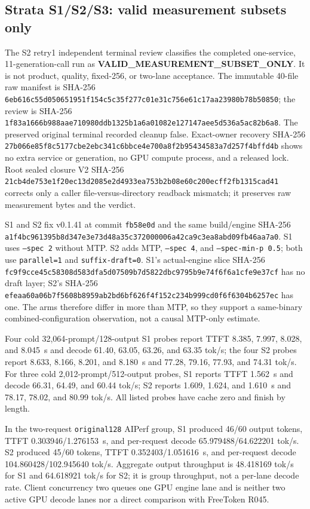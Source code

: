 \documentclass[11pt]{article}
\begin{document}
\subsection{Strata S1/S2/S3: valid measurement subsets only}
\label{sec:strata}

The S2 retry1 independent terminal review classifies the completed one-service, 11-generation-call run as \textbf{VALID\_MEASUREMENT\_SUBSET\_ONLY}. It is not product, quality, fixed-256, or two-lane acceptance. The immutable 40-file raw manifest is SHA-256 \texttt{6eb616c55d050651951f154c5c35f277c01e31c756e61c17aa23980b78b50850}; the review is SHA-256 \texttt{1f83a1666b988aae710980ddb1325b1a6a01082e127147aee5d536a5ac82b6a8}. The preserved original terminal recorded cleanup false. Exact-owner recovery SHA-256 \texttt{27b066e85f8c5177cbe2ebc341c6bbce4e700a8f2b95434583a7d257f4bffd4b} shows no extra service or generation, no GPU compute process, and a released lock. Root sealed closure V2 SHA-256 \texttt{21cb4de753e1f20ec13d2085e2d4933ea753b2b08e60c200ecff2fb1315cad41} corrects only a caller file-versus-directory readback mismatch; it preserves raw measurement bytes and the verdict.

S1 and S2 fix v0.1.41 at commit \texttt{fb58e0d} and the same build/engine SHA-256 \texttt{a1f4bc961395b8d347e3e73d48a35c372000006a42ca9c3ea8abd09fb46aa7a0}. S1 uses \texttt{--spec 2} without MTP. S2 adds MTP, \texttt{--spec 4}, and \texttt{--spec-min-p 0.5}; both use \texttt{parallel=1} and \texttt{suffix-draft=0}. S1's actual-engine slice SHA-256 \texttt{fc9f9cce45c58308d583dfa5d07509b7d5822dbc9795b9e74f6f6a1cfe9e37cf} has no draft layer; S2's SHA-256 \texttt{efeaa60a06b7f5608b8959ab2bd6bf626f4f152c234b999cd0f6f6304b6257ec} has one. The arms therefore differ in more than MTP, so they support a same-binary combined-configuration observation, not a causal MTP-only estimate.

Four cold 32,064-prompt/128-output S1 probes report TTFT 8.385, 7.997, 8.028, and 8.045~s and decode 61.40, 63.05, 63.26, and 63.35 tok/s; the four S2 probes report 8.633, 8.166, 8.201, and 8.180~s and 77.28, 79.16, 77.93, and 74.31 tok/s. For three cold 2,012-prompt/512-output probes, S1 reports TTFT 1.562~s and decode 66.31, 64.49, and 60.44 tok/s; S2 reports 1.609, 1.624, and 1.610~s and 78.17, 78.02, and 80.99 tok/s. All listed probes have cache zero and finish by length.

In the two-request \texttt{original128} AIPerf group, S1 produced 46/60 output tokens, TTFT 0.303946/1.276153~s, and per-request decode 65.979488/64.622201 tok/s. S2 produced 45/60 tokens, TTFT 0.352403/1.051616~s, and per-request decode 104.860428/102.945640 tok/s. Aggregate output throughput is 48.418169 tok/s for S1 and 64.618921 tok/s for S2; it is group throughput, not a per-lane decode rate. Client concurrency two queues one GPU engine lane and is neither two active GPU decode lanes nor a direct comparison with FreeToken R045.
\end{document}
